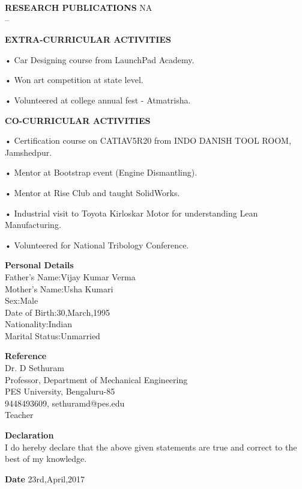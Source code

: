 \documentclass{article}
\begin{document}
\textbf{\LARGE RESEARCH PUBLICATIONS} \hspace{190pt}NA\\
--\vspace{10px}


\textbf{\LARGE EXTRA-CURRICULAR ACTIVITIES}
\begin{itemize}
	{\large \item •	Car Designing course from LaunchPad Academy. }
	{\large \item •	Won art competition at state level.}
	{\large \item •	Volunteered at college annual fest - Atmatrisha. }
\end{itemize}\vspace{15px}

\textbf{\LARGE CO-CURRICULAR ACTIVITIES}
\begin{enumerate}
{\large \item •	Certification course on CATIAV5R20 from INDO DANISH TOOL ROOM, Jamshedpur. }
{\large \item •	Mentor at Bootstrap event (Engine Dismantling). }
{\large \item •	Mentor at Rise Club and taught SolidWorks. }
{\large \item •	Industrial visit to Toyota Kirloskar Motor for understanding Lean Manufacturing. }
{\large \item •	Volunteered for National Tribology Conference. }
\end{enumerate}\vspace{15px}


\textbf{\LARGE Personal Details}\\
{\normalsize Father's Name:Vijay Kumar Verma\\
Mother's Name:Usha Kumari\\
Sex:Male\\
Date of Birth:30,March,1995\\
Nationality:Indian\\
Marital Status:Unmarried\\}


\textbf{\LARGE Reference}\\
{\normalsize Dr. D  Sethuram\\
	Professor, Department of Mechanical Engineering\\
	PES University, Bengaluru-85\\
	9448493609, sethuramd@pes.edu\\
	Teacher\\}

\textbf{\LARGE Declaration}\\
{\normalsize I do hereby declare that the above given statements are true and correct to the best of my knowledge.\\}



\textbf{\LARGE Date}\hspace{350pt}
{\normalsize 23rd,April,2017}

	
\end{document}

